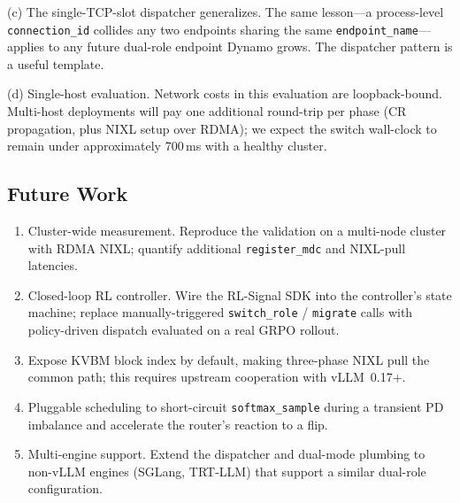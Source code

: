 \documentclass[10pt,twocolumn,letterpaper]{article}
\begin{document}
(c) The single-TCP-slot dispatcher generalizes. The same lesson---a process-level \texttt{connection\_id} collides any two endpoints sharing the same \texttt{endpoint\_name}---applies to any future dual-role endpoint Dynamo grows. The dispatcher pattern is a useful template.

(d) Single-host evaluation. Network costs in this evaluation are loopback-bound. Multi-host deployments will pay one additional round-trip per phase (CR propagation, plus NIXL setup over RDMA); we expect the switch wall-clock to remain under approximately 700\,ms with a healthy cluster.

\subsection{Future Work}

\begin{enumerate}[nosep]
\item Cluster-wide measurement. Reproduce the validation on a multi-node cluster with RDMA NIXL; quantify additional \texttt{register\_mdc} and NIXL-pull latencies.
\item Closed-loop RL controller. Wire the RL-Signal SDK into the controller's state machine; replace manually-triggered \texttt{switch\_role} / \texttt{migrate} calls with policy-driven dispatch evaluated on a real GRPO rollout.
\item Expose KVBM block index by default, making three-phase NIXL pull the common path; this requires upstream cooperation with vLLM~0.17+.
\item Pluggable scheduling to short-circuit \texttt{softmax\_sample} during a transient PD imbalance and accelerate the router's reaction to a flip.
\item Multi-engine support. Extend the dispatcher and dual-mode plumbing to non-vLLM engines (SGLang, TRT-LLM) that support a similar dual-role configuration.
\end{enumerate}
\end{document}
